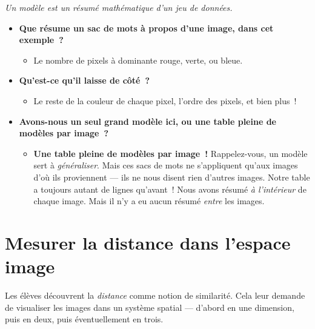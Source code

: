 \documentclass[12pt,a4paper]{article}
\begin{document}
\begin{keypointbox}
  \emph{Un modèle est un résumé mathématique d'un jeu de données.}

  \begin{itemize}
    \item \textbf{Que résume un sac de mots à propos d'une image, dans cet exemple~?}
    \begin{itemize}
      \item Le nombre de pixels à dominante rouge, verte, ou bleue.
    \end{itemize}
    \item \textbf{Qu'est-ce qu'il laisse de côté~?}
    \begin{itemize}
      \item Le reste de la couleur de chaque pixel, l'ordre des pixels, et bien plus~!
    \end{itemize}
    \item \textbf{Avons-nous un seul grand modèle ici, ou une table pleine de modèles par image~?}
    \begin{itemize}
      \item \textbf{Une table pleine de modèles par image~!} Rappelez-vous, un modèle sert à \emph{généraliser}. Mais ces sacs de mots ne s'appliquent qu'aux images d'où ils proviennent — ils ne nous disent rien d'autres images. Notre table a toujours autant de lignes qu'avant~! Nous avons résumé \emph{à l'intérieur} de chaque image. Mais il n'y a eu aucun résumé \emph{entre} les images.
    \end{itemize}
  \end{itemize}
\end{keypointbox}

\newpage

\section[Distance dans l'espace image]{Mesurer la distance dans l'espace image}

\begin{overviewbox}
  Les élèves découvrent la \emph{distance} comme notion de similarité. Cela leur demande de visualiser les images dans un système spatial — d'abord en une dimension, puis en deux, puis éventuellement en trois.
\end{overviewbox}
\end{document}

